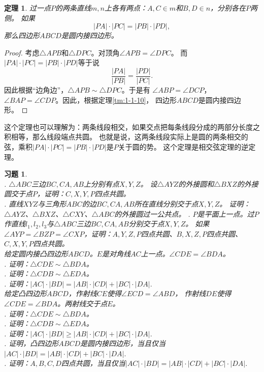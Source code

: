 \documentclass[12pt,UTF8]{ctexbook}
\newtheorem{tm}{定理}[section]
\newtheorem{xt}{习题}[section]
\begin{document}
\begin{tm}\label{tm:1-1-20}
    过一点$P$的两条直线$m,n$上各有两点：$A, C\in m$和$B, D \in n$，分别各在$P$两侧。
    如果
    $$ |PA| \cdot |PC| = |PB| \cdot |PD|, $$
    那么四边形$ABCD$是圆内接四边形。
\end{tm}

\begin{proof}
    考虑$\triangle APB$和$\triangle DPC$。对顶角$\angle APB = \angle DPC$。
    而$ |PA| \cdot |PC| = |PB| \cdot |PD|$等于说
    $$ \frac{|PA|}{|PB|} = \frac{|PD|}{|PC|}.$$
    因此根据“边角边”，$\triangle APB \sim \triangle DPC$。于是有
    $\angle ABP = \angle DCP$，$\angle BAP = \angle CDP$。因此，根据定理\ref{tm:1-1-10}，
    四边形$ABCD$是圆内接四边形。
\end{proof}
这个定理也可以理解为：两条线段相交，如果交点把每条线段分成的两部分长度之积相等，那么线段端点共圆。
也就是说，这两条线段实际上是圆的两条相交的弦，乘积$ |PA| \cdot |PC| = |PB| \cdot |PD|$是$P$关于圆的势。
这个定理是相交弦定理的逆定理。

\begin{xt}\label{xt:1-1-10}
    \mbox{}\\
    . $\triangle ABC$三边$BC,CA,AB$上分别有点$X,Y,Z$。
    设$\triangle AYZ$的外接圆和$\triangle BXZ$的外接圆交于点$P$，证明：$C,X,Y,P$四点共圆。\\
    . 直线$XYZ$与三角形$ABC$的边$BC,CA,AB$所在直线分别交于点$X,Y,Z$。
    证明：$\triangle AYZ$、$\triangle BXZ$、$\triangle CXY$、$\triangle ABC$的外接圆过一公共点。
    . $P$是平面上一点。过$P$作直线$l_1,l_2,l_3$与$\triangle ABC$三边$BC,CA,AB$分别交于点$X,Y,Z$。
    如果$\angle AYP = \angle BZP = \angle CXP$，证明：$A, Y, Z, P$四点共圆、$B, X, Z, P$四点共圆、$C,X,Y,P$四点共圆。\\
    给定圆内接凸四边形$ABCD$。$E$是对角线$AC$上一点。$\angle CDE = \angle BDA$。\\
    . 证明：$\triangle CDE \sim \triangle BDA$。\\
    . 证明：$\triangle CDB \sim \triangle EDA$。\\
    . 证明：$|AC| \cdot |BD| = |AB| \cdot |CD| + |BC| \cdot |DA|.$\\
    给定凸四边形$ABCD$，作射线$CE$使得$\angle ECD = \angle ABD$，
    作射线$DE$使得$\angle CDE = \angle BDA$。两射线交于点$E$。\\
    . 证明：$\triangle CDE \sim \triangle BDA$。\\
    . 证明：$\triangle CDB \sim \triangle EDA$。\\
    . 证明：$|AC| \cdot |BD| \geqslant |AB| \cdot |CD| + |BC| \cdot |DA|.$ \\
    . 证明，凸四边形$ABCD$是圆内接四边形，当且仅当$|AC| \cdot |BD| = |AB| \cdot |CD| + |BC| \cdot |DA|.$\\
    . 证明：$A,B,C,D$四点共圆，当且仅当$|AC| \cdot |BD| = |AB| \cdot |CD| + |BC| \cdot |DA|.$
\end{xt}
\end{document}
